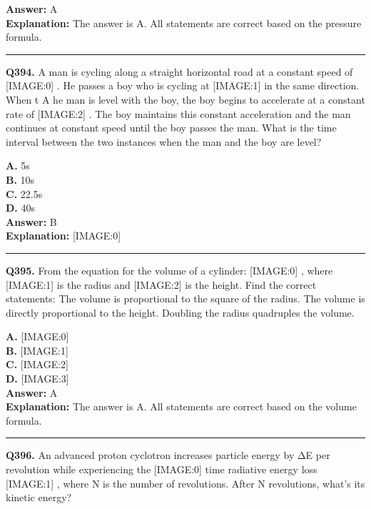 \documentclass[12pt]{article}
\begin{document}
\textbf{Answer:} A \\
\textbf{Explanation:} The answer is A. All statements are correct based on the pressure formula.

\hrule
\vspace{1em}


\noindent
\textbf{Q394.} A man is cycling along a straight horizontal road at a constant speed of
[IMAGE:0]
. He passes a boy who is cycling at
[IMAGE:1]
in the same direction. When t
A
he man is level with the boy, the boy begins to accelerate at a constant rate of
[IMAGE:2]
. The boy maintains this constant acceleration and the man continues at constant speed until the boy passes the man. What is the time interval between the two instances when the man and the boy are level?



\textbf{A.} 5s \\
\textbf{B.} 10s \\
\textbf{C.} 22.5s \\
\textbf{D.} 40s \\

\textbf{Answer:} B \\
\textbf{Explanation:} [IMAGE:0]

\hrule
\vspace{1em}


\noindent
\textbf{Q395.} From the equation for the volume of a cylinder:
[IMAGE:0]
, where
[IMAGE:1]
is the radius and
[IMAGE:2]
is the height. Find the correct statements:
The volume is proportional to the square of the radius.
The volume is directly proportional to the height.
Doubling the radius quadruples the volume.



\textbf{A.} [IMAGE:0] \\
\textbf{B.} [IMAGE:1] \\
\textbf{C.} [IMAGE:2] \\
\textbf{D.} [IMAGE:3] \\

\textbf{Answer:} A \\
\textbf{Explanation:} The answer is A. All statements are correct based on the volume formula.

\hrule
\vspace{1em}


\noindent
\textbf{Q396.} An advanced proton cyclotron increases particle energy by ΔE per revolution while experiencing the
[IMAGE:0]
time radiative energy loss
[IMAGE:1]
, where N is the number of revolutions. After N revolutions, what's its kinetic energy?
\end{document}
